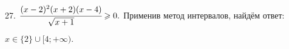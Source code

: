 27. $\cfrac{(x-2)^2(x+2)(x-4)}{\sqrt{x+1}}\geqslant0.$
Применив метод интервалов, найдём ответ:
\begin{figure}[ht!]
\end{figure}
$x\in\{2\}\cup[4;+\infty).$\\
